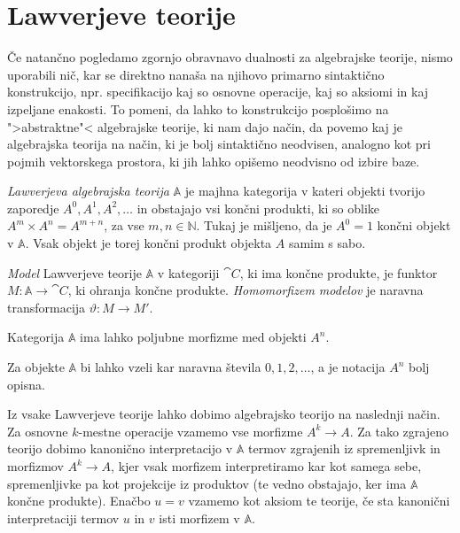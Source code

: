 \documentclass[../kategoricna_logika.tex]{subfiles}
\begin{document}
\section{Lawverjeve teorije}
\label{sec:org3518651}
Če natančno pogledamo zgornjo obravnavo dualnosti za algebrajske teorije, nismo uporabili nič,
kar se direktno nanaša na njihovo primarno sintaktično konstrukcijo, npr. specifikacijo
kaj so osnovne operacije, kaj so aksiomi in kaj izpeljane enakosti.
To pomeni, da lahko to konstrukcijo posplošimo na ">abstraktne"< algebrajske teorije,
ki nam dajo način, da povemo kaj je algebrajska teorija na način, ki je bolj
sintaktično neodvisen, analogno kot pri pojmih vektorskega prostora, ki jih lahko
opišemo neodvisno od izbire baze.
\begin{definicija}
\emph{Lawverjeva algebrajska teorija} \(\mathbb{A}\) je majhna kategorija
v kateri objekti tvorijo zaporedje \(A^0, A^1, A^2, \ldots\) in obstajajo
vsi končni produkti, ki so oblike \(A^m \times A^n = A^{m + n}\), za vse \(m,n \in \mathbb{N}\).
Tukaj je mišljeno, da je \(A^0 = 1\) končni objekt v \(\mathbb{A}\).
Vsak objekt je torej končni produkt objekta \(A\) samim s sabo.

\emph{Model} Lawverjeve teorije \(\mathbb{A}\) v kategoriji \(\cat{C}\),
ki ima končne produkte, je funktor \(M : \mathbb{A} \to \cat{C}\),
ki ohranja končne produkte. \emph{Homomorfizem modelov} je naravna
transformacija \(\vartheta : M \to M'\).
\end{definicija}
%
\begin{opomba}
Kategorija \(\mathbb{A}\) ima lahko poljubne morfizme med objekti \(A^n\).
\end{opomba}
\begin{opomba}
Za objekte \(\mathbb{A}\) bi lahko vzeli kar naravna števila \(0, 1, 2, \ldots\),
a je notacija \(A^n\) bolj opisna.
\end{opomba}
%
Iz vsake Lawverjeve teorije lahko dobimo algebrajsko teorijo na naslednji način.
Za osnovne \(k\)-mestne operacije vzamemo vse morfizme \(A^k \to A\). 
Za tako zgrajeno teorijo dobimo kanonično interpretacijo v \(\mathbb{A}\) termov
zgrajenih iz spremenljivk in morfizmov \(A^k \to A\), kjer vsak morfizem interpretiramo
kar kot samega sebe, spremenljivke pa kot projekcije iz produktov (te vedno obstajajo,
ker ima \(\mathbb{A}\) končne produkte). Enačbo \(u = v\) vzamemo kot aksiom te teorije,
če sta kanonični interpretaciji termov \(u\) in \(v\) isti morfizem v \(\mathbb{A}\).
\end{document}
